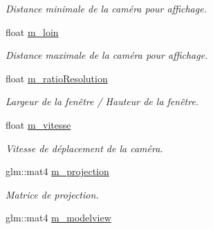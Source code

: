 \begin{DoxyCompactItemize}
\begin{DoxyCompactList}\small\item\em Distance minimale de la caméra pour affichage. \end{DoxyCompactList}\item 
\hypertarget{classAbstractCamera_a29c540279b97ed810fdd7afd65bf6b4e}{float \hyperlink{classAbstractCamera_a29c540279b97ed810fdd7afd65bf6b4e}{m\+\_\+loin}}\label{classAbstractCamera_a29c540279b97ed810fdd7afd65bf6b4e}

\begin{DoxyCompactList}\small\item\em Distance maximale de la caméra pour affichage. \end{DoxyCompactList}\item 
\hypertarget{classAbstractCamera_ac4dccb042e77bb91c2aa66a315112043}{float \hyperlink{classAbstractCamera_ac4dccb042e77bb91c2aa66a315112043}{m\+\_\+ratio\+Resolution}}\label{classAbstractCamera_ac4dccb042e77bb91c2aa66a315112043}

\begin{DoxyCompactList}\small\item\em Largeur de la fenêtre / Hauteur de la fenêtre. \end{DoxyCompactList}\item 
\hypertarget{classAbstractCamera_a554f06bd5f27d68700f844cc4e6b7dba}{float \hyperlink{classAbstractCamera_a554f06bd5f27d68700f844cc4e6b7dba}{m\+\_\+vitesse}}\label{classAbstractCamera_a554f06bd5f27d68700f844cc4e6b7dba}

\begin{DoxyCompactList}\small\item\em Vitesse de déplacement de la caméra. \end{DoxyCompactList}\item 
\hypertarget{classAbstractCamera_aa99260e08a54ece7bcfc81ca44baf82c}{glm\+::mat4 \hyperlink{classAbstractCamera_aa99260e08a54ece7bcfc81ca44baf82c}{m\+\_\+projection}}\label{classAbstractCamera_aa99260e08a54ece7bcfc81ca44baf82c}

\begin{DoxyCompactList}\small\item\em Matrice de projection. \end{DoxyCompactList}\item 
\hypertarget{classAbstractCamera_aa26d2fe7b5921b46c5721e17e3a05c15}{glm\+::mat4 \hyperlink{classAbstractCamera_aa26d2fe7b5921b46c5721e17e3a05c15}{m\+\_\+modelview}}\label{classAbstractCamera_aa26d2fe7b5921b46c5721e17e3a05c15}


\end{DoxyCompactItemize}
